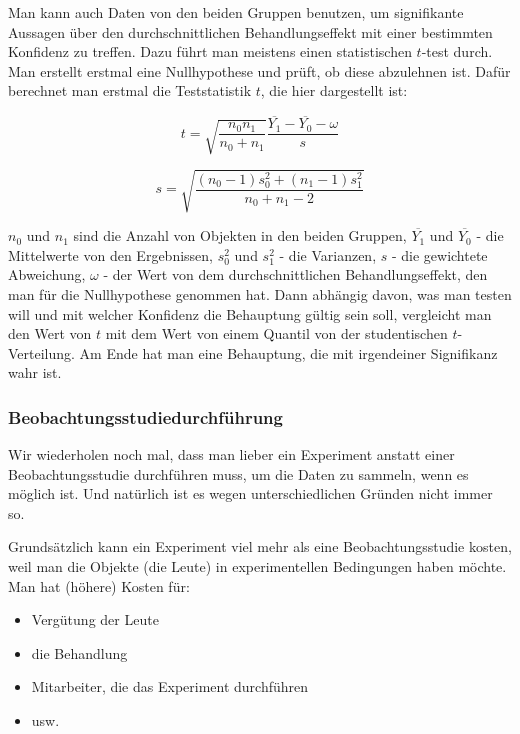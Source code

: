 \documentclass[12pt,a4paper,twoside]{scrartcl}
\numberwithin{equation}{section}
\begin{document}
\noindent
Man kann auch Daten von den beiden Gruppen benutzen, um signifikante Aussagen über den durchschnittlichen Behandlungseffekt mit einer bestimmten Konfidenz zu treffen. Dazu führt man meistens einen statistischen $t$-test durch. Man erstellt erstmal eine Nullhypothese und prüft, ob diese abzulehnen ist. Dafür berechnet man erstmal die Teststatistik $t$, die hier dargestellt ist:\par

\begin{equation}
  t = \sqrt{\frac{n_0n_1}{n_0+n_1}}\frac{\overline{Y_1}-\overline{Y_0}-\omega}{s}
\end{equation} 

\begin{equation}
  s = \sqrt{\frac{(n_0-1)s_0^2+(n_1-1)s_1^2}{n_0+n_1-2}}
\end{equation} 

\noindent
$n_0$ und $n_1$ sind die Anzahl von Objekten in den beiden Gruppen, $\overline{Y_1}$ und $\overline{Y_0}$ - die Mittelwerte von den Ergebnissen, $s_0^2$ und $s_1^2$ - die Varianzen, $s$ - die gewichtete Abweichung, $\omega$ - der Wert von dem durchschnittlichen Behandlungseffekt, den man für die Nullhypothese genommen hat. Dann abhängig davon, was man testen will und mit welcher Konfidenz die Behauptung gültig sein soll, vergleicht man den Wert von $t$ mit dem Wert von einem Quantil von der studentischen $t$-Verteilung. Am Ende hat man eine Behauptung, die mit irgendeiner Signifikanz wahr ist.\cite{ttest}    
\par    

\subsubsection{Beobachtungsstudiedurchführung}\label{subsubsec:beobachtungsstudietedurchführung}

Wir wiederholen noch mal, dass man lieber ein Experiment anstatt einer Beobachtungsstudie durchführen muss, um die Daten zu sammeln, wenn es möglich ist. Und natürlich ist es wegen unterschiedlichen Gründen nicht immer so.\par 

\noindent
Grundsätzlich kann ein Experiment viel mehr als eine Beobachtungsstudie kosten, weil man die Objekte (die Leute) in experimentellen Bedingungen haben möchte. Man hat (höhere) Kosten für:\par

\begin{itemize}
  \item Vergütung der Leute
  \item die Behandlung
  \item Mitarbeiter, die das Experiment durchführen
  \item usw.
\end{itemize}
   
\end{document}
